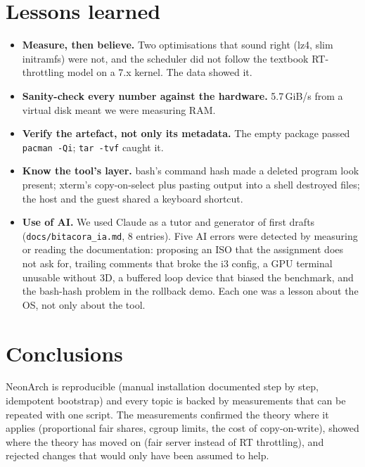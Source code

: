 \documentclass[10.5pt,a4paper]{article}
\newcommand{\cmd}[1]{\texttt{#1}}
\begin{document}
\section{Lessons learned}
\begin{itemize}
\item \textbf{Measure, then believe.} Two optimisations that sound right (lz4, slim initramfs) were not, and the scheduler did not follow the textbook RT-throttling model on a 7.x kernel. The data showed it.
\item \textbf{Sanity-check every number against the hardware.} 5.7\,GiB/s from a virtual disk meant we were measuring RAM.
\item \textbf{Verify the artefact, not only its metadata.} The empty package passed \cmd{pacman -Qi}; \cmd{tar -tvf} caught it.
\item \textbf{Know the tool's layer.} bash's command hash made a deleted program look present; xterm's copy-on-select plus pasting output into a shell destroyed files; the host and the guest shared a keyboard shortcut.
\item \textbf{Use of AI.} We used Claude as a tutor and generator of first drafts (\cmd{docs/bitacora\_ia.md}, 8 entries). Five AI errors were detected by measuring or reading the documentation: proposing an ISO that the assignment does not ask for, trailing comments that broke the i3 config, a GPU terminal unusable without 3D, a buffered loop device that biased the benchmark, and the bash-hash problem in the rollback demo. Each one was a lesson about the OS, not only about the tool.
\end{itemize}

\section{Conclusions}
NeonArch is reproducible (manual installation documented step by step, idempotent bootstrap) and every topic is backed by measurements that can be repeated with one script. The measurements confirmed the theory where it applies (proportional fair shares, cgroup limits, the cost of copy-on-write), showed where the theory has moved on (fair server instead of RT throttling), and rejected changes that would only have been assumed to help.
\end{document}
